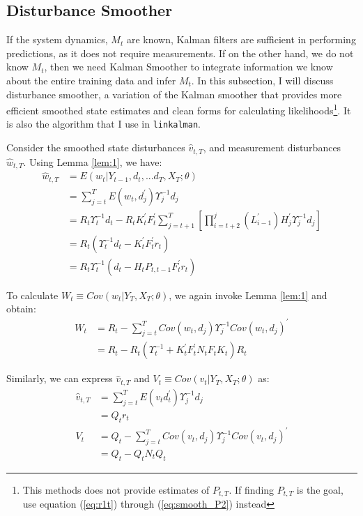 \documentclass[12pt]{article}
\numberwithin{equation}{section}
\begin{document}
\subsection{Disturbance Smoother}
If the system dynamics, $M_t$ are known, Kalman filters are sufficient in performing predictions, as it does not require measurements. If on the other hand, we do not know $M_t$, then we need Kalman Smoother to integrate information we know about the entire training data and infer $M_t$. In this subsection, I will discuss disturbance smoother, a variation of the Kalman smoother that provides more efficient smoothed state estimates and clean forms for calculating likelihoods\footnote{This methods does not provide estimates of $P_{t,T}$. If finding $P_{t,T}$ is the goal, use equation (\ref{eq:r1t}) through (\ref{eq:smooth_P2}) instead}. It is also the algorithm that I use in \texttt{linkalman}. 

Consider the smoothed state disturbances $\hat{v}_{t,T}$, and measurement disturbances $\hat{w}_{t,T}$. Using Lemma \ref{lem:1}, we have:
\begin{align}
    \hat{w}_{t,T} &= E(w_t|Y_{t-1}, d_t,...d_T,X_T;\theta) \nonumber \\
    &= \sum_{j=t}^TE(w_t,d_j^{'})\Upsilon_j^{-1}d_j \nonumber \\
    &= R_t\Upsilon_t^{-1}d_t - R_tK_t^{'}F_t^{'}\sum_{j=t+1}^T\left[\prod_{i=t+2}^j\left(L_{i-1}^{'}\right)H_j^{'}\Upsilon_j^{-1}d_j\right] \nonumber \\
    &= R_t(\Upsilon_t^{-1}d_t - K_t^{'}F_t^{'}r_t) \nonumber \\
    &= R_t\Upsilon_t^{-1}(d_t - H_tP_{t,t-1}F_t^{'}r_t) \label{eq:disturb_w}
\end{align}

To calculate $W_t \equiv Cov(w_t|Y_T,X_T;\theta)$, we again invoke Lemma \ref{lem:1} and obtain:
\begin{align}
    W_t &= R_t - \sum_{j=t}^TCov(w_t,d_j)\Upsilon_j^{-1}Cov(w_t,d_j)^{'} \nonumber \\
    &= R_t - R_t(\Upsilon_t^{-1}+K_t^{'}F_t^{'}N_tF_tK_t)R_t \label{eq:disturb_W}
\end{align}

Similarly, we can express $\hat{v}_{t,T}$ and $V_t \equiv Cov(v_t|Y_T,X_T;\theta)$ as:
\begin{align}
    \hat{v}_{t,T} &= \sum_{j=t}^{T}E(v_td_t^{'})\Upsilon_j^{-1}d_j \nonumber \\
    &= Q_tr_t \label{eq:disturb_v} \\
    V_t &= Q_t - \sum_{j=t}^{T}Cov(v_t, d_j)\Upsilon_j^{-1}Cov(v_t,d_j)^{'} \nonumber \\
    &= Q_t - Q_tN_tQ_t \label{eq:disturb_V}
\end{align}
\end{document}
